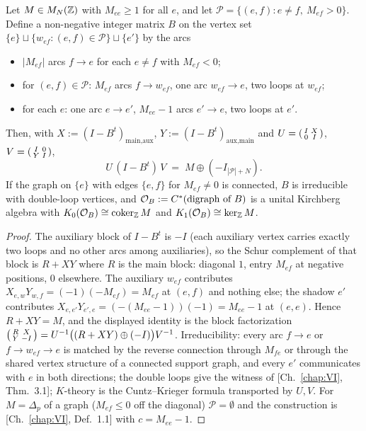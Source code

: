 \begin{lemma}\label{X:lem:signed}
Let $M\in M_N(\mathbb{Z})$ with $M_{ee}\ge1$ for all $e$, and let $\mathcal P=\{(e,f):e\neq f,\
M_{ef}>0\}$. Define a non-negative integer matrix $B$ on the vertex set
$\{e\}\sqcup\{w_{ef}:(e,f)\in\mathcal P\}\sqcup\{e'\}$ by the arcs
\begin{itemize}
\item $|M_{ef}|$ arcs $f\to e$ for each $e\neq f$ with $M_{ef}<0$;
\item for $(e,f)\in\mathcal P$: $M_{ef}$ arcs $f\to w_{ef}$, one arc $w_{ef}\to e$, two loops at
$w_{ef}$;
\item for each $e$: one arc $e\to e'$, $M_{ee}-1$ arcs $e'\to e$, two loops at $e'$.
\end{itemize}
Then, with $X:=(I-B^{t})_{\text{main},\text{aux}}$, $Y:=(I-B^{t})_{\text{aux},\text{main}}$
and $U=\begin{psmallmatrix}I&X\\0&I\end{psmallmatrix}$,
$V=\begin{psmallmatrix}I&0\\Y&I\end{psmallmatrix}$,
\[
U\,(I-B^{t})\,V\;=\;M\oplus(-I_{|\mathcal P|+N}) .
\]
If the graph on $\{e\}$ with edges $\{e,f\}$ for $M_{ef}\neq0$ is connected, $B$ is
irreducible with double-loop vertices, and $\mathcal{O}_B:=C^*(\text{digraph of }B)$ is a unital
Kirchberg algebra with $K_0(\mathcal{O}_B)\cong\operatorname{coker}_{\mathbb{Z}} M$ and $K_1(\mathcal{O}_B)\cong\ker_{\mathbb{Z}} M$.
\end{lemma}

\begin{proof}
The auxiliary block of $I-B^{t}$ is $-I$ (each auxiliary vertex carries exactly two loops and
no other arcs among auxiliaries), so the Schur complement of that block is $R+XY$ where
$R$ is the main block: diagonal $1$, entry $M_{ef}$ at negative positions, $0$ elsewhere.
The auxiliary $w_{ef}$ contributes $X_{e,w}Y_{w,f}=(-1)(-M_{ef})=M_{ef}$ at $(e,f)$ and
nothing else; the shadow $e'$ contributes $X_{e,e'}Y_{e',e}=(-(M_{ee}-1))(-1)=M_{ee}-1$ at
$(e,e)$. Hence $R+XY=M$, and the displayed identity is the block factorization
$\begin{psmallmatrix}R&X\\Y&-I\end{psmallmatrix}=U^{-1}\bigl((R+XY)\oplus(-I)\bigr)V^{-1}$.
Irreducibility: every arc $f\to e$ or $f\to w_{ef}\to e$ is matched by the reverse
connection through $M_{fe}$ or through the shared vertex structure of a connected support
graph, and every $e'$ communicates with $e$ in both directions; the double loops give the
witness of [Ch.~\ref{chap:VI}, Thm.~3.1]; $K$-theory is the Cuntz--Krieger formula transported by $U,V$.
For $M=\Delta_p$ of a graph ($M_{ef}\le0$ off the diagonal) $\mathcal P=\emptyset$ and the
construction is [Ch.~\ref{chap:VI}, Def.~1.1] with $c=M_{ee}-1$.
\end{proof}

